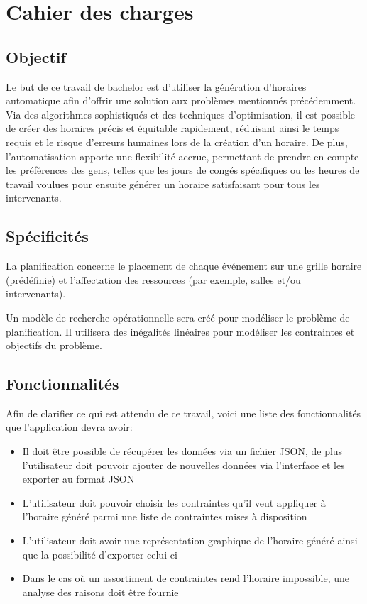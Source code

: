 \section{Cahier des charges}
\subsection{Objectif}
Le but de ce travail de bachelor est d'utiliser la génération d'horaires automatique afin d'offrir une solution aux problèmes mentionnés précédemment. Via des algorithmes sophistiqués et des techniques d’optimisation, il est possible de créer des horaires précis et équitable rapidement, réduisant ainsi le temps requis et le risque d’erreurs humaines lors de la création d’un horaire. De plus, l’automatisation apporte une flexibilité accrue, permettant de prendre en compte les préférences des gens, telles que les jours de congés spécifiques ou les heures de travail voulues pour ensuite générer un horaire satisfaisant pour tous les intervenants.

\subsection{Spécificités}
La planification concerne le placement de chaque événement sur une grille horaire (prédéfinie) et l’affectation des ressources (par exemple, salles et/ou intervenants).

Un modèle de recherche opérationnelle sera créé pour modéliser le problème de planification. Il utilisera des inégalités linéaires pour modéliser les contraintes et objectifs du problème.

\subsection{Fonctionnalités}

Afin de clarifier ce qui est attendu de ce travail, voici une liste des fonctionnalités que l'application devra avoir:

\begin{itemize}
    \item Il doit être possible de récupérer les données via un fichier JSON, de plus l'utilisateur doit pouvoir ajouter de nouvelles données via l'interface et les exporter au format JSON
    \item L'utilisateur doit pouvoir choisir les contraintes qu'il veut appliquer à l'horaire généré parmi une liste de contraintes mises à disposition
    \item L'utilisateur doit avoir une représentation graphique de l'horaire généré ainsi que la possibilité d'exporter celui-ci
    \item Dans le cas où un assortiment de contraintes rend l'horaire impossible, une analyse des raisons doit être fournie
\end{itemize}

